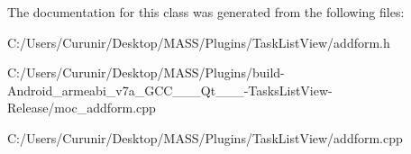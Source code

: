 The documentation for this class was generated from the following files\+:\begin{DoxyCompactItemize}
\item 
C\+:/\+Users/\+Curunir/\+Desktop/\+M\+A\+S\+S/\+Plugins/\+Task\+List\+View/addform.\+h\item 
C\+:/\+Users/\+Curunir/\+Desktop/\+M\+A\+S\+S/\+Plugins/build-\/\+Android\+\_\+armeabi\+\_\+v7a\+\_\+\+G\+C\+C\+\_\+\_\+\_\+\+Qt\+\_\+\_\+\_-\/\+Tasks\+List\+View-\/\+Release/moc\+\_\+addform.\+cpp\item 
C\+:/\+Users/\+Curunir/\+Desktop/\+M\+A\+S\+S/\+Plugins/\+Task\+List\+View/addform.\+cpp\end{DoxyCompactItemize}
